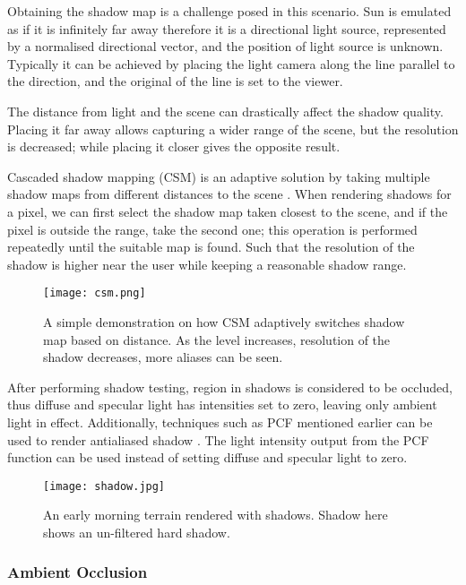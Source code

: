 \documentclass[oneside, a4paper]{report}
\begin{document}
    Obtaining the shadow map is a challenge posed in this scenario. Sun is emulated as if it is infinitely far away therefore it is a directional light source, represented by a normalised directional vector, and the position of light source is unknown. Typically it can be achieved by placing the light camera along the line parallel to the direction, and the original of the line is set to the viewer.

    The distance from light and the scene can drastically affect the shadow quality. Placing it far away allows capturing a wider range of the scene, but the resolution is decreased; while placing it closer gives the opposite result.
    
    Cascaded shadow mapping (CSM) is an adaptive solution by taking multiple shadow maps from different distances to the scene \cite{csm}. When rendering shadows for a pixel, we can first select the shadow map taken closest to the scene, and if the pixel is outside the range, take the second one; this operation is performed repeatedly until the suitable map is found. Such that the resolution of the shadow is higher near the user while keeping a reasonable shadow range.

    \begin{figure}[H]
        \center
        \texttt{[image: csm.png]}
        \caption{A simple demonstration on how CSM adaptively switches shadow map based on distance. As the level increases, resolution of the shadow decreases, more aliases can be seen.}
    \end{figure}

    After performing shadow testing, region in shadows is considered to be occluded, thus diffuse and specular light has intensities set to zero, leaving only ambient light in effect. Additionally, techniques such as PCF mentioned earlier can be used to render antialiased shadow \cite{pcf}. The light intensity output from the PCF function can be used instead of setting diffuse and specular light to zero.

    \begin{figure}[H]
        \texttt{[image: shadow.jpg]}
        \caption{An early morning terrain rendered with shadows. Shadow here shows an un-filtered hard shadow.}
    \end{figure}

    \subsubsection{Ambient Occlusion}
\end{document}

